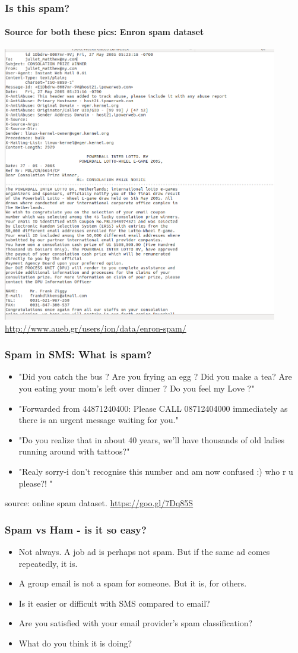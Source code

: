 \documentclass{beamer}
\begin{document}
\begin{frame}%
\frametitle{Is this spam?}
\framesubtitle{Source for both these pics: Enron spam dataset}
\includegraphics[width=0.9\textwidth]{spam.png}
\\ \url{http://www.aueb.gr/users/ion/data/enron-spam/}
\end{frame}

\begin{frame}%
\frametitle{Spam in SMS: What is spam?}
\begin{itemize}
\item "Did you catch the bus ? Are you frying an egg ? Did you make a tea? Are you eating your mom's left over dinner ? Do you feel my Love ?"
\item "Forwarded from 44871240400: Please CALL 08712404000 immediately as there is an urgent message waiting for you."
\item "Do you realize that in about 40 years, we'll have thousands of old ladies running around with tattoos?"
\item "Realy sorry-i don't recognise this number and am now confused :) who r u please?! "
\end{itemize}
source: online spam dataset. \url{https://goo.gl/7Dq85S}
\end{frame}

\begin{frame}%
\frametitle{Spam vs Ham - is it so easy?}
\begin{itemize}
\item Not always. A job ad is perhaps not spam. But if the same ad comes repeatedly, it is.
\item A group email is not a spam for someone. But it is, for others.
\item Is it easier or difficult with SMS compared to email? \pause
\item Are you satisfied with your email provider's spam classification? \pause
\item What do you think it is doing? 
\end{itemize}
\end{frame}
\end{document}
